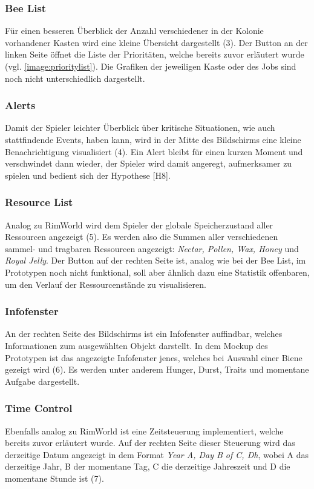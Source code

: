 \subsubsection{Bee List}
Für einen besseren Überblick der Anzahl verschiedener in der Kolonie vorhandener Kasten wird eine kleine Übersicht dargestellt (3). Der Button an der linken Seite öffnet die Liste der Prioritäten, welche bereits zuvor erläutert wurde (vgl. \autoref{image:prioritylist}). Die Grafiken der jeweiligen Kaste oder des Jobs sind noch nicht unterschiedlich dargestellt.

\subsubsection{Alerts}
Damit der Spieler leichter Überblick über kritische Situationen, wie auch stattfindende Events, haben kann, wird in der Mitte des Bildschirms eine kleine Benachrichtigung visualisiert (4). Ein Alert bleibt für einen kurzen Moment und verschwindet dann wieder, der Spieler wird damit angeregt, aufmerksamer zu spielen und bedient sich der Hypothese [H8].

\subsubsection{Resource List}
Analog zu RimWorld wird dem Spieler der globale Speicherzustand aller Ressourcen angezeigt (5). Es werden also die Summen aller verschiedenen sammel- und tragbaren Ressourcen angezeigt: \textit{Nectar, Pollen, Wax, Honey} und \textit{Royal Jelly}. Der Button auf der rechten Seite ist, analog wie bei der Bee List, im Prototypen noch nicht funktional, soll aber ähnlich dazu eine Statistik offenbaren, um den Verlauf der Ressourcenstände zu visualisieren.

\subsubsection{Infofenster}
An der rechten Seite des Bildschirms ist ein Infofenster auffindbar, welches Informationen zum ausgewählten Objekt darstellt. In dem Mockup des Prototypen ist das angezeigte Infofenster jenes, welches bei Auswahl einer Biene gezeigt wird (6). Es werden unter anderem Hunger, Durst, Traits und momentane Aufgabe dargestellt.

\subsubsection{Time Control}
Ebenfalls analog zu RimWorld ist eine Zeitsteuerung implementiert, welche bereits zuvor erläutert wurde. Auf der rechten Seite dieser Steuerung wird das derzeitige Datum angezeigt in dem Format \textit{Year A, Day B of C, Dh}, wobei A das derzeitige Jahr, B der momentane Tag, C die derzeitige Jahreszeit und D die momentane Stunde ist (7).


